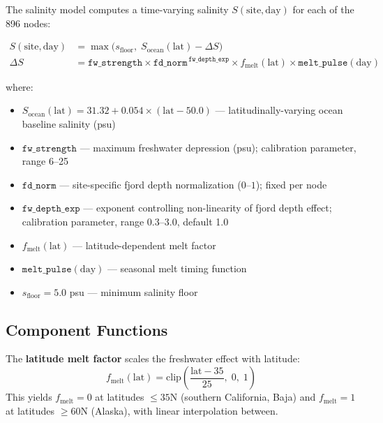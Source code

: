 \documentclass[11pt,a4paper]{article}
\begin{document}
The salinity model computes a time-varying salinity $S(\text{site}, \text{day})$ for each of the 896 nodes:

\begin{align}
\label{eq:salinity}
S(\text{site}, \text{day}) &= \max\!\big(s_{\text{floor}},\; S_{\text{ocean}}(\text{lat}) - \Delta S\big) \\
\label{eq:depression}
\Delta S &= \texttt{fw\_strength} \times \texttt{fd\_norm}^{\,\texttt{fw\_depth\_exp}} \times f_{\text{melt}}(\text{lat}) \times \texttt{melt\_pulse}(\text{day})
\end{align}

where:

\begin{itemize}[nosep]
    \item $S_{\text{ocean}}(\text{lat}) = 31.32 + 0.054 \times (\text{lat} - 50.0)$ --- latitudinally-varying ocean baseline salinity (psu)
    \item $\texttt{fw\_strength}$ --- maximum freshwater depression (psu); calibration parameter, range 6--25
    \item $\texttt{fd\_norm}$ --- site-specific fjord depth normalization ($0$--$1$); fixed per node
    \item $\texttt{fw\_depth\_exp}$ --- exponent controlling non-linearity of fjord depth effect; calibration parameter, range 0.3--3.0, default 1.0
    \item $f_{\text{melt}}(\text{lat})$ --- latitude-dependent melt factor
    \item $\texttt{melt\_pulse}(\text{day})$ --- seasonal melt timing function
    \item $s_{\text{floor}} = 5.0$ psu --- minimum salinity floor
\end{itemize}

\subsection{Component Functions}

The \textbf{latitude melt factor} scales the freshwater effect with latitude:
\begin{equation}
\label{eq:fmelt}
f_{\text{melt}}(\text{lat}) = \text{clip}\!\left(\frac{\text{lat} - 35}{25},\; 0,\; 1\right)
\end{equation}
This yields $f_{\text{melt}} = 0$ at latitudes $\leq 35$\textdegree N (southern California, Baja) and $f_{\text{melt}} = 1$ at latitudes $\geq 60$\textdegree N (Alaska), with linear interpolation between.
\end{document}
